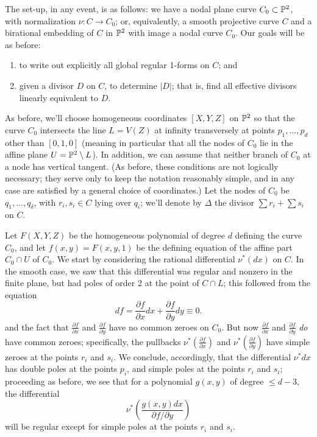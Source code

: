The set-up, in any event, is as follows: we have a nodal plane curve $C_0 \subset {\mathbb P}^2$, with normalization $\nu : C \to C_0$; or, equivalently, a smooth projective curve $C$ and a birational embedding of $C$ in ${\mathbb P}^2$ with image a nodal curve $C_0$. Our goals will be as before: 
\begin{enumerate}
\item to write out explicitly all global regular 1-forms on $C$; and
\item given a divisor $D$ on $C$, to  determine $|D|$; that is, find all effective divisors linearly equivalent to $D$.
\end{enumerate}

As before, we'll choose homogeneous coordinates  $[X,Y,Z]$ on ${\mathbb P}^2$ so that the curve $C_0$ intersects the line $L = V(Z)$ at infinity transversely at points $p_1,\dots,p_d$ other than $[0,1,0]$ (meaning in particular that all the nodes of $C_0$ lie in the affine plane $U = {\mathbb P}^2 \setminus L$).
In addition, we can assume that  neither branch of $C_0$ at a node has vertical tangent. (As before, these conditions are not logically necessary; they serve only to keep the notation reasonably simple, and in any case are satisfied by a general choice of coordinates.) Let the nodes of $C_0$ be $q_1,\dots,q_\delta$, with $r_i, s_i \in C$ lying over $q_i$; we'll denote by $\Delta$ the divisor $\sum r_i + \sum s_i$ on $C$.

Let $F(X,Y,Z)$ be the homogeneous polynomial of degree $d$ defining the curve $C_0$, and let $f(x,y) = F(x,y,1)$ be the defining equation of the affine part $C_0 \cap U$ of $C_0$. We start by considering the rational differential $\nu^*(dx)$ on $C$. In the smooth case, we saw that this differential was regular and nonzero in the finite plane, but had poles of order 2 at the point of $C \cap L$; this followed from the equation
$$
 df = \frac{\partial f}{\partial x}dx + \frac{\partial f}{\partial y}dy \equiv 0.
 $$
and the fact that $\frac{\partial f}{\partial x}$ and $\frac{\partial f}{\partial y}$ have no common zeroes on $C_0$. But now $\frac{\partial f}{\partial x}$ and $\frac{\partial f}{\partial y}$ \emph{do} have common zeroes; specifically, the pullbacks $\nu^*(\frac{\partial f}{\partial x})$ and $\nu^*(\frac{\partial f}{\partial y})$ have simple zeroes at the points $r_i$ and $s_i$. We conclude, accordingly, that the differential $\nu^*dx$ has double poles at the points $p_i$, and simple poles at the points $r_i$ and $s_i$; proceeding as before, we see that for a polynomial $g(x,y)$ of degree $\leq d-3$, the differential
$$
\nu^*( \frac{g(x,y)dx}{\partial f/\partial y})
$$
will be regular except for simple poles at the points $r_i$ and $s_i$.

